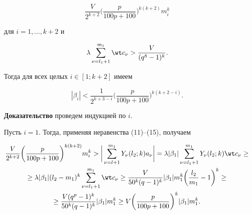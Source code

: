 \begin{lem}
\begin{equation}
\frac{V}{2^{k+2}} \bigg(\frac{p}{100p+100}\bigg)^{k(k+2)} m_i^k


\end{equation}


для $i=1, \dotsc, k+2$ и


\begin{equation}


\lambda \sum_{\nu=l_1+1}^{m_1} \wt c_{\nu}>\frac{V}{(q^8-1)^k}.


\end{equation}





Тогда для всех целых $i \in [1; k+2]$ имеем


\begin{equation}


|\beta_i|<\frac{1}{2^{k+3-i}}\bigg(\frac{p}{100p+100}\bigg)^{k(k+2-i)}. 


\end{equation}


\end{lem}








{\bf Доказательство} проведем индукцией по $i$. 


Пусть $i=1$. Тогда, применяя неравенства (11)--(15), получаем


\begin{multline*}


\frac{V}{2^{k+2}} \bigg(\frac{p}{100p+100}\bigg)^{k(k+2)} m_i^k>


\bigg|\sum_{\nu=l+1}^{m_1} Y_{\nu} (l_2; k) a_{\nu} \bigg|=


\lambda |\beta_1| \sum_{\nu=l_1+1}^{m_1} Y_{\nu} (l_2; k) 


\wt c_{\nu} \ge \\


%


\ge \lambda |\beta_1| (l_2-m_1)^k 


\sum_{\nu=l_1+1}^{m_1} \wt c_{\nu} \ge 


\frac{V}{50^k (q-1)^k} |\beta_1| m_1^k \bigg(\frac{l_2}{m_1}-1\bigg)^k \ge \\


%


\ge \frac{V (q^p-1)^k}{50^k (q-1)^k} | \beta_1 | m_1^k \ge 


V \bigg(\frac{p}{100p+100}\bigg)^k |\beta_1| m_1^k. 


\end{multline*}


